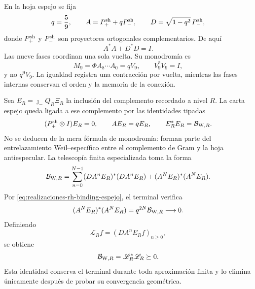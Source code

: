 En la hoja espejo se fija
\begin{equation}\label{eq:realizaciones-rh-q}
 q=\frac59,
 \qquad
 A=P_+^{\rm sh}+qP_-^{\rm sh},
 \qquad
 D=\sqrt{1-q^2}\,P_-^{\rm sh},
\end{equation}
donde \(P_+^{\rm sh}\) y \(P_-^{\rm sh}\) son proyectores ortogonales
complementarios. De aquí
\begin{equation}\label{eq:realizaciones-rh-conservacion-local}
 A^*A+D^*D=I.
\end{equation}
Las nueve fases coordinan una sola vuelta. Su monodromía es
\begin{equation}\label{eq:realizaciones-rh-monodromia}
 M_9=\Phi A_8\cdots A_0=qV_9,
 \qquad V_9^*V_9=I,
\end{equation}
y no \(q^9V_9\). La igualdad registra una contracción por vuelta, mientras
las fases internas conservan el orden y la memoria de la conexión.

Sea \(E_R=\jmath_-Q_R\Xi_R\) la inclusión del complemento recordado a
nivel \(R\). La carta espejo queda ligada a ese complemento por las
identidades tipadas
\begin{equation}\label{eq:realizaciones-rh-binding-espejo}
 (P_+^{\rm sh}\otimes I)E_R=0,
 \qquad
 AE_R=qE_R,
 \qquad
 E_R^*E_R=\mathcal B_{{\rm W},R}.
\end{equation}
No se deducen de la mera fórmula de monodromía: forman parte del
entrelazamiento Weil--específico entre el complemento de Gram y la hoja
antiespecular. La telescopía finita especializada toma la forma
\begin{equation}\label{eq:realizaciones-rh-ref9}
 \mathcal B_{{\rm W},R}
 =\sum_{n=0}^{N-1}(DA^nE_R)^*(DA^nE_R)
 +(A^NE_R)^*(A^NE_R).
\end{equation}
Por \eqref{eq:realizaciones-rh-binding-espejo}, el terminal verifica
\begin{equation}\label{eq:realizaciones-rh-terminal}
 (A^NE_R)^*(A^NE_R)
 =q^{2N}\mathcal B_{{\rm W},R}
 \longrightarrow0.
\end{equation}
Definiendo
\begin{equation}\label{eq:realizaciones-rh-L}
 \mathscr L_R f=(DA^nE_Rf)_{n\geq0},
\end{equation}
se obtiene
\begin{equation}\label{eq:realizaciones-rh-lstar-l}
 \mathcal B_{{\rm W},R}=\mathscr L_R^*\mathscr L_R\succeq0.
\end{equation}
Esta identidad conserva el terminal durante toda aproximación finita y lo
elimina únicamente después de probar su convergencia geométrica.

